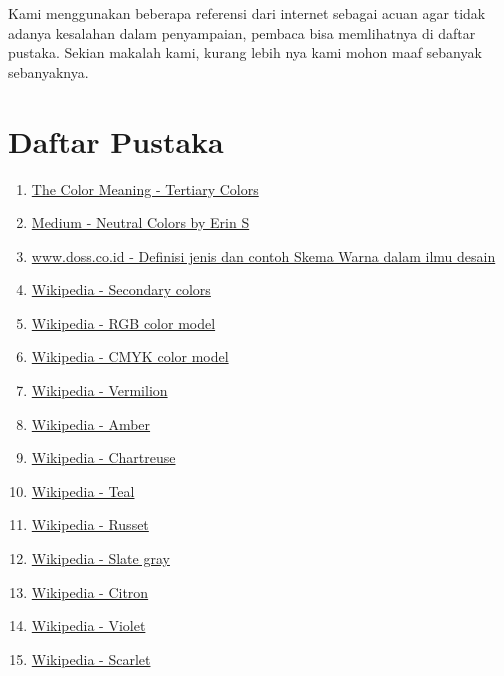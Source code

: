 \documentclass[a4paper,12pt]{article}
\newcommand{\nonumsection}[1]{\section*{#1}
\addcontentsline{toc}{section}{#1}
}
\begin{document}
Kami menggunakan beberapa referensi dari internet sebagai acuan agar tidak adanya kesalahan dalam penyampaian, pembaca bisa memlihatnya di daftar pustaka. Sekian makalah kami, kurang lebih nya kami mohon maaf sebanyak sebanyaknya.
\newpage
\nonumsection{Daftar Pustaka}
\begin{enumerate}
  \item \textcolor{blue}{\href{https://thecolorsmeaning.com/tertiary-colors/}{The Color Meaning - Tertiary Colors}}
  \item \textcolor{blue}{\href{https://medium.com/a-history-of-color/neutral-colors-e394cfce452}{Medium - Neutral Colors by Erin S}}
  \item \textcolor{blue}{\href{https://www.doss.co.id/news/definisi-jenis-dan-contoh-skema-warna-pada-imu-design}{www.doss.co.id - Definisi jenis dan contoh Skema Warna dalam ilmu desain}}
  \item \textcolor{blue}{\href{https://en.m.wikipedia.org/wiki/Secondary_color}{Wikipedia - Secondary colors}}
  \item \textcolor{blue}{\href{https://en.m.wikipedia.org/wiki/RGB_color_model}{Wikipedia - RGB color model}}
  \item \textcolor{blue}{\href{https://en.m.wikipedia.org/wiki/CMYK_color_model}{Wikipedia - CMYK color model}}
  \item \textcolor{blue}{\href{https://en.m.wikipedia.org/wiki/Vermilion}{Wikipedia - Vermilion}}
  \item \textcolor{blue}{\href{https://en.m.wikipedia.org/wiki/Amber_(color)}{Wikipedia - Amber}}
  \item \textcolor{blue}{\href{https://en.m.wikipedia.org/wiki/Chartreuse_(color)}{Wikipedia - Chartreuse}}
  \item \textcolor{blue}{\href{https://en.m.wikipedia.org/wiki/Teal}{Wikipedia - Teal}}
  \item \textcolor{blue}{\href{https://en.m.wikipedia.org/wiki/Russet_(color)}{Wikipedia - Russet}}
  \item \textcolor{blue}{\href{https://en.m.wikipedia.org/wiki/Slate_gray}{Wikipedia - Slate gray}}
  \item \textcolor{blue}{\href{https://en.m.wikipedia.org/wiki/Citron_(color)}{Wikipedia - Citron}}
  \item \textcolor{blue}{\href{https://en.m.wikipedia.org/wiki/Violet_(color)}{Wikipedia - Violet}}
  \item \textcolor{blue}{\href{https://en.m.wikipedia.org/wiki/Scarlet_(color)}{Wikipedia - Scarlet}}
  
\end{enumerate}
\end{document}
